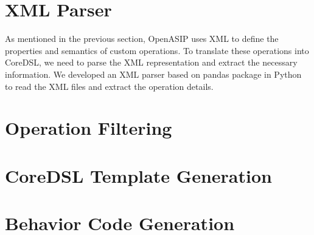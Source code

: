 \section{XML Parser}

As mentioned in the previous section, OpenASIP uses XML to define the properties and semantics of custom operations.
To translate these operations into CoreDSL, we need to parse the XML representation and extract the necessary information.
We developed an XML parser based on pandas package in Python to read the XML files and extract the operation details.


\section{Operation Filtering}

\section{CoreDSL Template Generation}

\section{Behavior Code Generation}